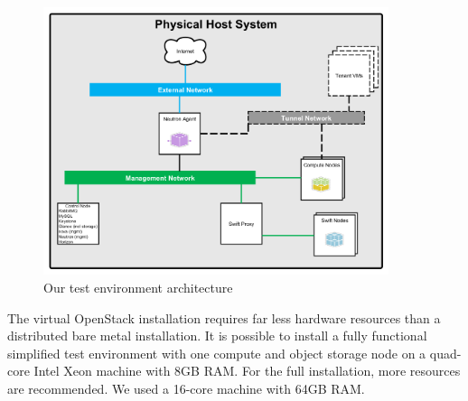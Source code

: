 \begin{figure}[h]
	\centering
		\includegraphics[width=0.90\textwidth]{images/architectureEN.PNG}
	\caption{Our test environment architecture}
	\label{fig:arch}
\end{figure}

The virtual OpenStack installation requires far less hardware resources than a distributed bare metal installation. It is possible to install a fully functional simplified test environment with one compute and object storage node on a quad-core Intel Xeon machine with 8GB RAM. For the full installation, more resources are recommended. We used a 16-core machine with 64GB RAM. 












